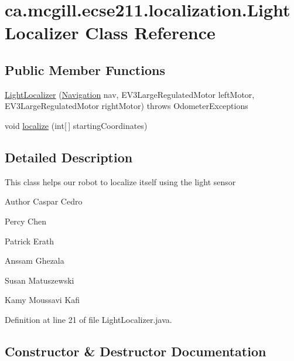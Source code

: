 \hypertarget{classca_1_1mcgill_1_1ecse211_1_1localization_1_1_light_localizer}{}\section{ca.\+mcgill.\+ecse211.\+localization.\+Light\+Localizer Class Reference}
\label{classca_1_1mcgill_1_1ecse211_1_1localization_1_1_light_localizer}
\subsection*{Public Member Functions}
\begin{DoxyCompactItemize}
\item 
\hyperlink{classca_1_1mcgill_1_1ecse211_1_1localization_1_1_light_localizer_aa37a75b7c32c02fe261845021f0734b7}{Light\+Localizer} (\hyperlink{classca_1_1mcgill_1_1ecse211_1_1project_1_1_navigation}{Navigation} nav, E\+V3\+Large\+Regulated\+Motor left\+Motor, E\+V3\+Large\+Regulated\+Motor right\+Motor)  throws Odometer\+Exceptions 
\item 
void \hyperlink{classca_1_1mcgill_1_1ecse211_1_1localization_1_1_light_localizer_afb295ca8cd6623ac3e9eacb1d31b75b9}{localize} (int\mbox{[}$\,$\mbox{]} starting\+Coordinates)
\end{DoxyCompactItemize}


\subsection{Detailed Description}
This class helps our robot to localize itself using the light sensor

\begin{DoxyAuthor}{Author}
Caspar Cedro 

Percy Chen 

Patrick Erath 

Anssam Ghezala 

Susan Matuszewski 

Kamy Moussavi Kafi 
\end{DoxyAuthor}


Definition at line 21 of file Light\+Localizer.\+java.



\subsection{Constructor \& Destructor Documentation}
\mbox{\label{classca_1_1mcgill_1_1ecse211_1_1localization_1_1_light_localizer_aa37a75b7c32c02fe261845021f0734b7}} 
